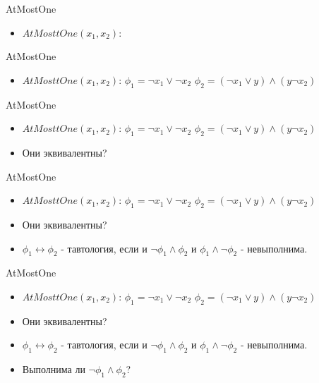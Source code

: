 \documentclass{beamer}
\begin{document}
\begin{frame}{AtMostOne}
\begin{itemize}
\item $AtMosttOne(x_1, x_2)$:\newline
\end{itemize}
\end{frame}

\begin{frame}{AtMostOne}
\begin{itemize}
\item $AtMosttOne(x_1, x_2)$:\newline
$\phi_1 = \lnot x_1 \vee \lnot x_2$\newline
$\phi_2 = (\lnot x_1 \vee y) \wedge (y \lnot x_2)$\newline
\end{itemize}
\end{frame}

\begin{frame}{AtMostOne}
\begin{itemize}
\item $AtMosttOne(x_1, x_2)$:\newline
$\phi_1 = \lnot x_1 \vee \lnot x_2$\newline
$\phi_2 = (\lnot x_1 \vee y) \wedge (y \lnot x_2)$\newline
\item Они эквивалентны?
\end{itemize}
\end{frame}

\begin{frame}{AtMostOne}
\begin{itemize}
\item $AtMosttOne(x_1, x_2)$:\newline
$\phi_1 = \lnot x_1 \vee \lnot x_2$\newline
$\phi_2 = (\lnot x_1 \vee y) \wedge (y \lnot x_2)$\newline
\item Они эквивалентны?
\item $\phi_1 \leftrightarrow \phi_2$ - тавтология, если и $\lnot \phi_1 \wedge \phi_2$ и $\phi_1 \wedge \lnot \phi_2$ -
невыполнима.
\end{itemize}
\end{frame}

\begin{frame}{AtMostOne}
\begin{itemize}
\item $AtMosttOne(x_1, x_2)$:\newline
$\phi_1 = \lnot x_1 \vee \lnot x_2$\newline
$\phi_2 = (\lnot x_1 \vee y) \wedge (y \lnot x_2)$\newline
\item Они эквивалентны?
\item $\phi_1 \leftrightarrow \phi_2$ - тавтология, если и $\lnot \phi_1 \wedge \phi_2$ и $\phi_1 \wedge \lnot \phi_2$ -
невыполнима.
\item Выполнима ли $\lnot \phi_1 \wedge \phi_2$?
\end{itemize}
\end{frame}
\end{document}
